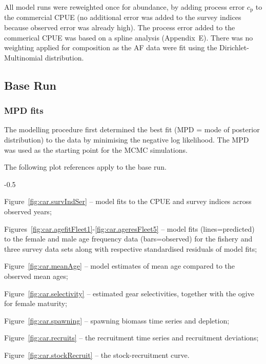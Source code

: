 \documentclass[11pt]{book}
\newcommand{\AppEqn}{Appendix~E}
\begin{document}
All model runs were reweighted once for abundance, by adding process error $c_\text{p}$ to the commercial CPUE (no additional error was added to the survey indices because observed error was already high).
The process error added to the commerical CPUE was based on a spline analysis (\AppEqn).
There was no weighting applied for composition as the AF data were fit using the Dirichlet-Multinomial distribution.

\subsection{Base Run}
\subsubsection{MPD fits}\label{sssMPD}


The modelling procedure first determined the best fit (MPD = mode of posterior distribution) to the data by minimising the negative log likelihood.
The MPD was used as the starting point for the MCMC simulations.

The following plot references apply to the base run.
\begin{itemize_csas}{-0.5}{}
  \item Figure~\ref{fig:car.survIndSer} -- model fits to the CPUE and survey indices across observed years;
  \item Figures~\ref{fig:car.agefitFleet1}-\ref{fig:car.ageresFleet5} -- model fits (lines=predicted) to the female and male age frequency data (bars=observed) for the fishery and three survey data sets along with respective standardised residuals of model fits;
  \item Figure~\ref{fig:car.meanAge} -- model estimates of mean age compared to the observed mean ages;
  \item Figure~\ref{fig:car.selectivity} -- estimated gear selectivities, together with the ogive for female maturity;
  \item Figure~\ref{fig:car.spawning} -- spawning biomass time series and depletion;
  \item Figure~\ref{fig:car.recruits} -- the recruitment time series and recruitment deviations;
  \item Figure~\ref{fig:car.stockRecruit} -- the stock-recruitment curve.
\end{itemize_csas}
\end{document}

